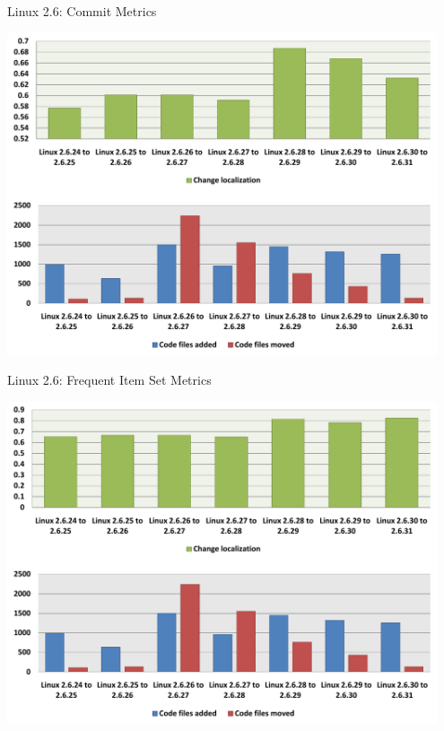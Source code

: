 \begin{frame}{Linux 2.6: Commit Metrics}

  \begin{center}
    \includegraphics[width=0.95\textwidth]{minings/linux-2-6-commit-metrics}
  \end{center}

\end{frame}


\begin{frame}{Linux 2.6: Frequent Item Set Metrics}

  \begin{center}
    \includegraphics[width=0.95\textwidth]{minings/linux-2-6-fis-metrics}
  \end{center}

\end{frame}

